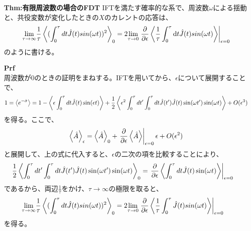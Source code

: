 \documentclass[a4paper,11pt]{jsarticle}
\begin{document}
\begin{itembox}[l]{\textbf{Thm:有限周波数の場合のFDT}}
    IFTを満たす確率的な系で、周波数$\omega$による揺動と、共役変数が変化したときの$X$のカレントの応答は、
    \begin{equation}
        \underset{\tau \to \infty}{\text{lim}}\frac{1}{\tau} \ev{(\int_{0}^{\tau} dt \hat{J}(t)sin(\omega t))^2}_0 = 2\underset{\tau \to 0}{\text{lim}} \left. \pdv{\epsilon} \ev{\frac{1}{\tau} \int_{0}^{\tau} \dd t \hat{J}(t)sin(\omega t)}\right|_{\epsilon = 0}
    \end{equation}
    のように書ける。
\end{itembox}
\textbf{Prf}\\
周波数が0のときの証明をまねする。IFTを用いてから、$\epsilon$について展開することで、
\begin{align}
    1=\ev{e^{-\hat{\sigma}}}&=1-\ev{\epsilon \int_{0}^{\tau} dt \hat{J}(t) \sin(\epsilon t)} + \frac{1}{2}\ev{\epsilon^2 \int_{0}^{\tau} dt' \int_{0}^{\tau} dt \hat{J}(t')\hat{J}(t) \sin(\omega t')\sin(\omega t)} + O(\epsilon^3)\\
\end{align}
を得る。ここで、
\begin{equation}
    \ev{\hat{A}}_{\epsilon} = \ev{\hat{A}}_0 + \left. \pdv{\epsilon} \ev{\hat{A}}\right| _{\epsilon = 0} \epsilon + O(\epsilon^2)
\end{equation}
と展開して、上の式に代入すると、$\epsilon$の二次の項を比較することにより、
\begin{align}
    \frac{1}{2}\ev{\int_{0}^{\tau} dt' \int_{0}^{\tau} dt \hat{J}(t')\hat{J}(t) \sin(\omega t')\sin(\omega t)}_0 &= \left. \pdv{\epsilon} \ev{\int_{0}^{\tau} dt \hat{J}(t) \sin(\omega t)}\right|_{\epsilon = 0}
\end{align}
であるから、両辺$\frac{1}{\tau}$をかけ、$\tau \to \infty$の極限を取ると、
\begin{align}
    \underset{\tau \to \infty}{\text{lim}}\frac{1}{\tau} \ev{(\int_{0}^{\tau} dt \hat{J}(t)sin(\omega t))^2}_0 &= 2\underset{\tau \to 0}{\text{lim}} \left. \pdv{\epsilon} \ev{\frac{1}{\tau} \int_{0}^{\tau} \hat{J}(t)sin(\omega t)}\right|_{\epsilon = 0}
\end{align}
を得る。\hfill \qedsymbol
\end{document}
